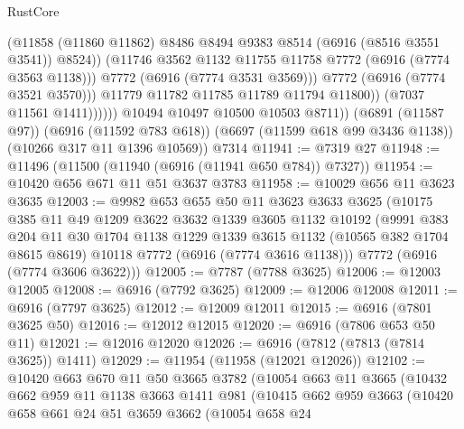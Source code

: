 \begin{lexlean}{RustCore}
\begin{coremodule}
                              (@11858
                                (@11860 @11862)
                                @8486
                                @8494
                                @9383
                                @8514
                                (@6916 (@8516 @3551 @3541))
                                @8524))
                            (@11746 @3562 @1132 @11755 @11758 @7772 (@6916 (@7774 @3563 @1138)))
                            @7772
                            (@6916 (@7774 @3531 @3569)))
                          @7772
                          (@6916 (@7774 @3521 @3570)))
                        @11779
                        @11782
                        @11785
                        @11789
                        @11794
                        @11800))
                    (@7037 @11561 @1411))))))
          @10494
          @10497
          @10500
          @10503
          @8711))
      (@6891 (@11587 @97))
      (@6916 (@11592 @783 @618))
      (@6697 (@11599 @618 @99 @3436 @1138))
      (@10266 @317 @11 @1396 @10569))
    @7314
@11941 := @7319 @27
@11948 := @11496 (@11500 (@11940 (@6916 (@11941 @650 @784)) @7327))
@11954 := @10420 @656 @671 @11 @51 @3637 @3783
@11958 := @10029 @656 @11 @3623 @3635
@12003 := @9982
    @653
    @655
    @50
    @11
    @3623
    @3633
    @3625
    (@10175
      @385
      @11
      @49
      @1209
      @3622
      @3632
      @1339
      @3605
      @1132
      @10192
      (@9991
        @383
        @204
        @11
        @30
        @1704
        @1138
        @1229
        @1339
        @3615
        @1132
        (@10565 @382 @1704 @8615 @8619)
        @10118
        @7772
        (@6916 (@7774 @3616 @1138)))
      @7772
      (@6916 (@7774 @3606 @3622)))
@12005 := @7787 (@7788 @3625)
@12006 := @12003 @12005
@12008 := @6916 (@7792 @3625)
@12009 := @12006 @12008
@12011 := @6916 (@7797 @3625)
@12012 := @12009 @12011
@12015 := @6916 (@7801 @3625 @50)
@12016 := @12012 @12015
@12020 := @6916 (@7806 @653 @50 @11)
@12021 := @12016 @12020
@12026 := @6916 (@7812 (@7813 (@7814 @3625)) @1411)
@12029 := @11954 (@11958 (@12021 @12026))
@12102 := @10420
    @663
    @670
    @11
    @50
    @3665
    @3782
    (@10054
      @663
      @11
      @3665
      (@10432
        @662
        @959
        @11
        @1138
        @3663
        @1411
        @981
        (@10415
          @662
          @959
          @3663
          (@10420
            @658
            @661
            @24
            @51
            @3659
            @3662
            (@10054
              @658
              @24

\end{coremodule}
\end{lexlean}
